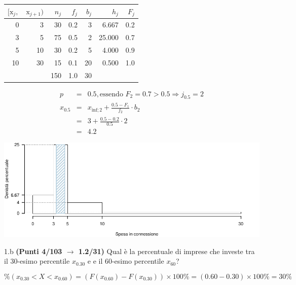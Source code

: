 \documentclass[
  11pt,
]{book}
\theoremstyle{mytheoremstyle}
\theoremstyle{mydefstyle}
\newenvironment{sol}
  {
  \begin{tcolorbox}[enhanced,breakable,arc=0.1mm,boxrule=1pt,colback=white,colframe=iblue,
  title=\bf \fontfamily{lmss}\selectfont \hspace{.5 cm} Soluzione,drop fuzzy shadow]

}{
\end{tcolorbox}
  }
\begin{document}
\begin{sol}

\begin{table}[H]
\centering
\begin{tabular}{rrrrrrr}
\toprule
$[\text{x}_j,$ & $\text{x}_{j+1})$ & $n_j$ & $f_j$ & $b_j$ & $h_j$ & $F_j$\\
\midrule
0 & 3 & 30 & 0.2 & 3 & 6.667 & 0.2\\
3 & 5 & 75 & 0.5 & 2 & 25.000 & 0.7\\
5 & 10 & 30 & 0.2 & 5 & 4.000 & 0.9\\
10 & 30 & 15 & 0.1 & 20 & 0.500 & 1.0\\
 &  & 150 & 1.0 & 30 &  & \\
\bottomrule
\end{tabular}
\end{table}

\begin{eqnarray*}
  p &=&  0.5 , \text{essendo }F_{ 2 }= 0.7  > 0.5  \Rightarrow j_{ 0.5 }= 2 \\
  x_{ 0.5 } &=& x_{\text{inf}; 2 } + \frac{ { 0.5 } - F_{ 1 }} {f_{ 2 }} \cdot b_{ 2 } \\
            &=&  3  + \frac {{ 0.5 } -  0.2 } { 0.5 } \cdot  2  \\
            &=&  4.2 
\end{eqnarray*}

\begin{center}\includegraphics{Esami_passati_con_soluzioni_files/figure-latex/unnamed-chunk-49-1} \end{center}

\end{sol}

1.b \textbf{(Punti 4/103 \(\rightarrow\) 1.2/31)} Qual è la percentuale di imprese che investe tra il 30-esimo percentile \(x_{0.30}\) e e il 60-esimo percentile \(x_{60}\)?

\begin{sol}
\[
\%(x_{0.30}<X<x_{0.60}) = (F(x_{0.60})-F(x_{0.30}))\times 100\% = (0.60- 0.30)\times 100\%=30\%
\]

\end{sol}
\end{document}
